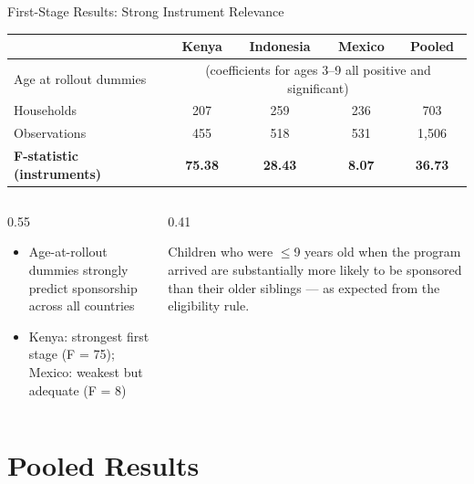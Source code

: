 \documentclass[aspectratio=169, 10pt]{beamer}
\begin{document}
\begin{frame}{First-Stage Results: Strong Instrument Relevance}
  \begin{center}
  \small
  \begin{tabular}{lcccc}
    \toprule
    & \textbf{Kenya} & \textbf{Indonesia} & \textbf{Mexico} & \textbf{Pooled} \\
    \midrule
    Age at rollout dummies & \multicolumn{4}{c}{(coefficients for ages 3--9 all positive and significant)} \\[0.3em]
    Households & 207 & 259 & 236 & 703 \\
    Observations & 455 & 518 & 531 & 1,506 \\
    \midrule
    \textbf{F-statistic (instruments)} & \textbf{75.38} & \textbf{28.43} & \textbf{8.07} & \textbf{36.73} \\
    \bottomrule
  \end{tabular}
  \end{center}
  \vspace{0.4em}
  \begin{columns}
    \begin{column}{0.55\textwidth}
      \begin{itemize}
        \item Age-at-rollout dummies strongly predict sponsorship across all countries
        \item Kenya: strongest first stage (F = 75); Mexico: weakest but adequate (F = 8)
      \end{itemize}
    \end{column}
    \begin{column}{0.41\textwidth}
      \begin{keybox}
        Children who were $\leq$9 years old when the program arrived are substantially more likely to be sponsored than their older siblings --- as expected from the eligibility rule.
      \end{keybox}
    \end{column}
  \end{columns}
\end{frame}

\section{Pooled Results}
\end{document}
